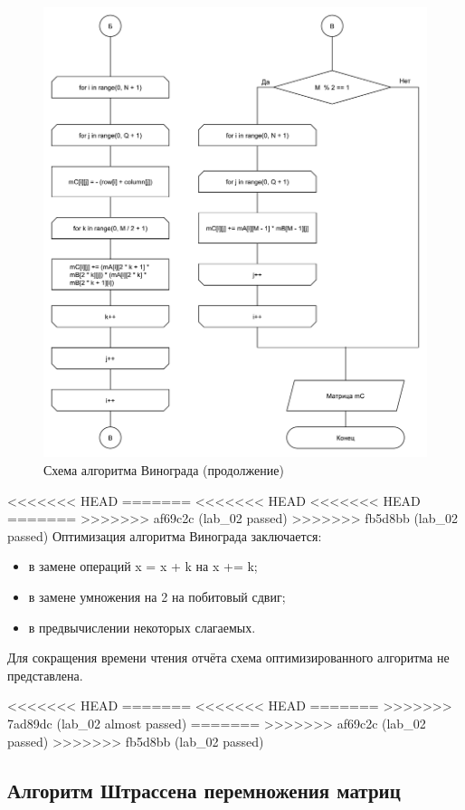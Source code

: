 \begin{figure}
	\centering
	\includegraphics[width=0.9\linewidth]{images/winograd2}
	\caption{Схема алгоритма Винограда (продолжение)}
	\label{fig:winograd2}
\end{figure}

<<<<<<< HEAD
=======
<<<<<<< HEAD
<<<<<<< HEAD
=======
>>>>>>> af69c2c (lab_02 passed)
>>>>>>> fb5d8bb (lab_02 passed)
Оптимизация алгоритма Винограда заключается:
\begin{itemize}
	\item в замене операций x = x + k на x += k;
	\item в замене умножения на 2 на побитовый сдвиг;
	\item в предвычислении некоторых слагаемых.
\end{itemize}

Для сокращения времени чтения отчёта схема оптимизированного алгоритма не представлена.

<<<<<<< HEAD
=======
<<<<<<< HEAD
=======
>>>>>>> 7ad89dc (lab_02 almost passed)
=======
>>>>>>> af69c2c (lab_02 passed)
>>>>>>> fb5d8bb (lab_02 passed)
\newpage

\subsection{Алгоритм Штрассена перемножения матриц}

